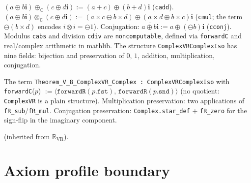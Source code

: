 \begin{definition}
\label{def:complex_ops}
\leanok
{}
$(a \oplus b\mathbf{i}) \oplus_{\mathbb{C}} (c \oplus d\mathbf{i})
:= (a + c) \oplus (b + d)\mathbf{i}$ (\texttt{cadd}).
$(a \oplus b\mathbf{i}) \otimes_{\mathbb{C}} (c \oplus d\mathbf{i})
:= (a{\times}c \ominus b{\times}d) \oplus (a{\times}d \oplus b{\times}c)\mathbf{i}$
(\texttt{cmul}; the term $\ominus(b {\times} d)$ encodes $i \otimes i = \ominus 1$).
Conjugation: $\overline{a \oplus b\mathbf{i}} := a \oplus (\ominus b)\mathbf{i}$
(\texttt{cconj}).
Modulus \texttt{cabs} and division \texttt{cdiv} are \texttt{noncomputable},
defined via \texttt{forwardC} and real/complex arithmetic in mathlib.
The structure \texttt{ComplexVRComplexIso} has nine fields:
bijection and preservation of $0$, $1$, addition, multiplication, conjugation.
\end{definition}

\begin{theorem}
\label{thm:T_V_8}
\leanok
{}
The term \texttt{Theorem\_V\_8\_ComplexVR\_Complex : ComplexVRComplexIso} with
\texttt{forwardC}($p$) $:= \langle \texttt{forwardR}(p.\texttt{fst}),\,
\texttt{forwardR}(p.\texttt{snd}) \rangle$
(no quotient: \texttt{ComplexVR} is a plain structure).
Multiplication preservation: two applications of \texttt{fR\_sub}/\texttt{fR\_mul}.
Conjugation preservation: \texttt{Complex.star\_def} + \texttt{fR\_zero} for the
sign-flip in the imaginary component.

\noindent{} (inherited from $\mathbb{R}_{\mathrm{VR}}$).
\end{theorem}

\section{Axiom profile boundary}
\label{sec:numbers_axiom_boundary}

